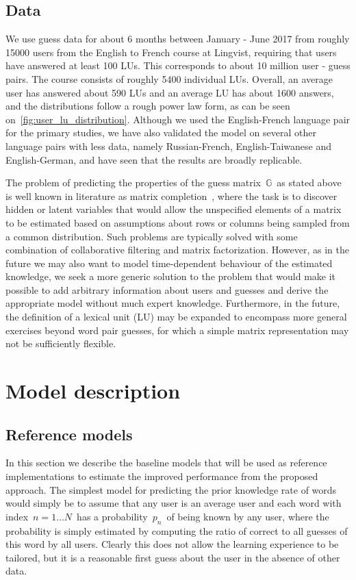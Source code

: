 \subsection{Data}
We use guess data for about 6 months between January - June 2017 from roughly 15000 users from the English to French course at Lingvist, requiring that users have answered at least 100 LUs. This corresponds to about 10 million user - guess pairs. The course consists of roughly 5400 individual LUs. Overall, an average user has answered about 590 LUs and an average LU has about 1600 answers, and the distributions follow a rough power law form, as can be seen on~\cref{fig:user_lu_distribution}. Although we used the English-French language pair for the primary studies, we have also validated the model on several other language pairs with less data, namely Russian-French, English-Taiwanese and English-German, and have seen that the results are broadly replicable.

The problem of predicting the properties of the guess matrix~$\mathbb{G}$~as stated above is well known in literature as matrix completion~\cite{candes2009exact}, where the task is to discover hidden or latent variables that would allow the unspecified elements of a matrix to be estimated based on assumptions about rows or columns being sampled from a common distribution. Such problems are typically solved with some combination of collaborative filtering and matrix factorization. However, as in the future we may also want to model time-dependent behaviour of the estimated knowledge, we seek a more generic solution to the problem that would make it possible to add arbitrary information about users and guesses and derive the appropriate model without much expert knowledge. Furthermore, in the future, the definition of a lexical unit (LU) may be expanded to encompass more general exercises beyond word pair guesses, for which a simple matrix representation may not be sufficiently flexible. 

\section{Model description}

\subsection{Reference models}

In this section we describe the baseline models that will be used as reference implementations to estimate the improved performance from the proposed approach. The simplest model for predicting the prior knowledge rate of words would simply be to assume that any user is an average user and each word with index~$n=1 \dots N$~has a probability~$p_n$~of being known by any user, where the probability is simply estimated by computing the ratio of correct to all guesses of this word by all users. Clearly this does not allow the learning experience to be tailored, but it is a reasonable first guess about the user in the absence of other data.


